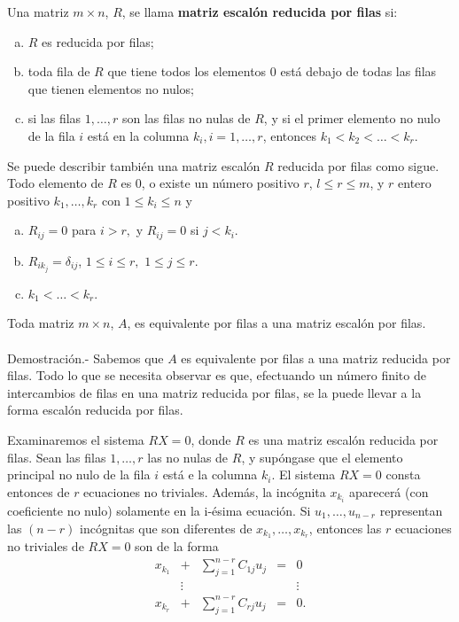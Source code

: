 \begin{def.}
    Una matriz $m\times n$, $R$, se llama \textbf{matriz escalón reducida por filas} si:
    \begin{enumerate}[(a)]
	\item $R$ es reducida por filas;
	\item toda fila de $R$ que tiene todos los elementos $0$ está debajo de todas las filas que tienen elementos no nulos;
	\item si las filas $1,\ldots, r$ son las filas no nulas de $R$, y si el primer elemento no nulo de la fila $i$ está en la columna $k_i, i=1,\ldots, r$, entonces $k_1<k_2<\ldots<k_r.$
    \end{enumerate}
    Se puede describir también una matriz escalón $R$ reducida por filas como sigue. Todo elemento de $R$ es $0$, o existe un número positivo $r$, $l\leq r \leq m$, y $r$ entero positivo $k_1,\ldots ,k_r$ con $1\leq k_i\leq n$ y
    \begin{enumerate}[(a)]
	\item $R_{ij}=0$ para $i>r,$ y $R_{ij}=0$ si $j<k_i$.
	\item $R_{ik_j}=\delta_{ij}$, $1\leq i \leq r,$ $1\leq j\leq r$.
	\item $k_1<\ldots < k_r$.
    \end{enumerate}
\end{def.}

\begin{teo}
    Toda matriz $m\times n$, $A$, es equivalente por filas a una matriz escalón por filas.\\\\
	Demostración.-\; Sabemos que $A$ es equivalente por filas a una matriz reducida por filas. Todo lo que se necesita observar es que, efectuando un número finito de intercambios de filas en una matriz reducida por filas, se la puede llevar a la forma escalón reducida por filas.
\end{teo}
\vspace{0.5cm}

Examinaremos el sistema $RX=0$, donde $R$ es una matriz escalón reducida por filas. Sean las filas $1,\ldots , r$ las no nulas de $R$, y supóngase que el elemento principal no nulo de la fila $i$ está e la columna $k_i$. El sistema $RX=0$ consta entonces de $r$ ecuaciones no triviales. Además, la incógnita $x_{k_i}$ aparecerá (con coeficiente no nulo) solamente en la i-ésima ecuación. Si $u_1,\ldots , u_{n-r}$ representan las $(n-r)$ incógnitas que son diferentes de $x_{k_1},\ldots , x_{k_r}$, entonces las $r$ ecuaciones no triviales de $RX=0$ son de la forma
\begin{equation}
    \begin{array}{ccccc}
	x_{k_1}&+&\sum\limits_{j=1}^{n-r}C_{1j} u_j&=&0\\
	       &\vdots&&&\vdots\\
	x_{k_r}&+&\sum\limits_{j=1}^{n-r}C_{rj} u_j&=&0.
    \end{array}
\end{equation}

